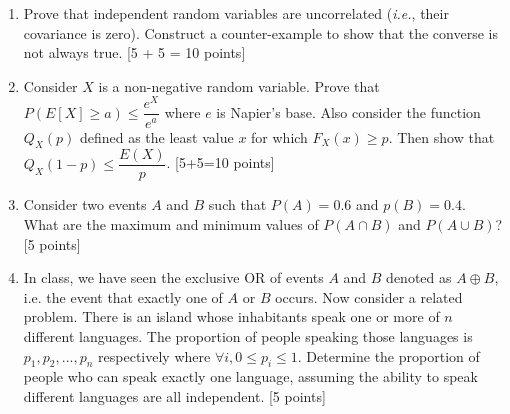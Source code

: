\documentclass[11pt]{article}
\begin{document}
\begin{enumerate}
\item Prove that independent random variables are uncorrelated (\textit{i.e.}, their covariance is zero). Construct a counter-example to show that the converse is not always true. \textsf{[5 + 5 = 10 points]}

\item Consider $X$ is a non-negative random variable. Prove that $P(E[X] \geq a) \leq \dfrac{e^{X}}{e^a}$ where $e$ is Napier's base. Also consider the function $Q_X(p)$ defined as the least value $x$ for which $F_X(x) \geq p$. Then show that $Q_X(1-p) \leq \dfrac{E(X)}{p}$. \textsf{[5+5=10 points]}

\item Consider two events $A$ and $B$ such that $P(A) = 0.6$ and $p(B) = 0.4$. What are the maximum and minimum values of $P(A \cap B)$ and $P(A \cup B)$? \textsf{[5 points]} 

\item In class, we have seen the exclusive OR of events $A$ and $B$ denoted as $A \oplus B$, i.e. the event that exactly one of $A$ or $B$ occurs. Now consider a related problem. There is an island whose inhabitants speak one or more of $n$ different languages. The proportion of people speaking those languages is $p_1, p_2, ..., p_n$ respectively where $\forall i, 0 \leq p_i \leq 1$. Determine the proportion of people who can speak exactly one language, assuming the ability to speak different languages are all independent. \textsf{[5 points]}

\end{enumerate}
\end{document}
